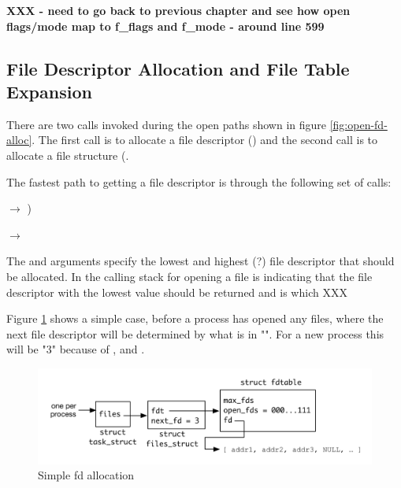  \textbf{XXX - need to go back to previous chapter and see how open flags/mode map to f\_flags and f\_mode - around line 599}


\subsection{File Descriptor Allocation and File Table Expansion}\label{fdalloc}

There are two calls invoked during the open paths shown in figure \ref{fig:open-fd-alloc}. The first call is to allocate a file descriptor () and the second call is to allocate a file structure (. 

The fastest path to getting a file descriptor is through the following set of calls:

\bigskip 
{}  $\rightarrow$ ) 

\vspace{1pt}
\hspace{3.37in}  $\rightarrow$ 
    
\bigskip
\normalsize
\noindent
The  and  arguments specify the lowest and highest (?) file descriptor that should be allocated. In the calling stack for opening a file  is  indicating that the file descriptor with the lowest value should be returned and  is  which XXX

Figure \ref{fig:fd_allocation_simple} shows a simple case, before a process has opened any files, where the next file descriptor will be determined by what is in "". For a new process this will be "3" because of ,  and .

\begin{figure}[h]
	\includegraphics[scale=0.6]{figures/fd_allocation_simple.pdf}
	\centering
	\caption{Simple fd allocation}
	\label{fig:fd_allocation_simple}
\end{figure}


